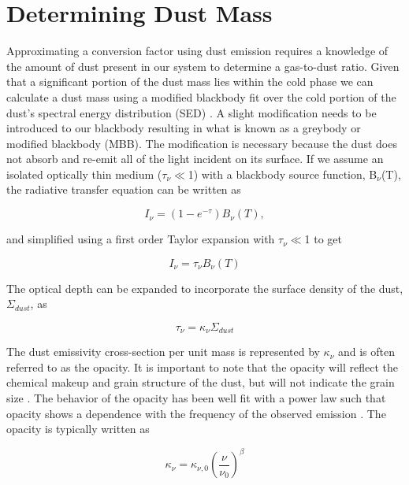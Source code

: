 \section{Determining Dust Mass}

Approximating a conversion factor using dust emission requires a knowledge of the amount of dust present in our system to determine a gas-to-dust ratio.  Given that a significant portion of the dust mass lies within the cold phase we can calculate a dust mass using a modified blackbody fit over the cold portion of the dust's spectral energy distribution (SED) \citep{galametz2012}.  A slight modification needs to be introduced to our blackbody resulting in what is known as a greybody or modified blackbody (MBB).  The modification is necessary because the dust does not absorb and re-emit all of the light incident on its surface.  If we assume an isolated optically thin medium ($\tau_\nu \ll$1) with a blackbody source function, B$_\nu$(T), the radiative transfer equation can be written as 

\begin{equation}\label{eq:mbb_rad_t}
  I_\nu = \left(1-e^{-\tau}\right)B_\nu\left(T\right),
\end{equation}

\noindent and simplified using a first order Taylor expansion with $\tau_\nu \ll$1 to get

\begin{equation}\label{eq:mbb_optd}
  I_\nu = \tau_\nu B_\nu\left(T\right)
\end{equation}

\noindent The optical depth can be expanded to incorporate the surface density of the dust, $\Sigma_{dust}$, as

\begin{equation}\label{eq:mbb_optd_def}
  \tau_\nu = \kappa_\nu \Sigma_{dust}
\end{equation}

\noindent The dust emissivity cross-section per unit mass is represented by $\kappa_\nu$ and is often referred to as the opacity.  It is important to note that the opacity will reflect the chemical makeup and grain structure of the dust, but will not indicate the grain size \citep{planckXI2013}.  The behavior of the opacity has been well fit with a power law such that opacity shows a dependence with the frequency of the observed emission \citep{hildebrand1983}.  The opacity is typically written as 

\begin{equation}\label{eq:mbb_kapp}
  \kappa_\nu = \kappa_{\nu,0}\left(\frac{\nu}{\nu_0}\right)^\beta
\end{equation}

